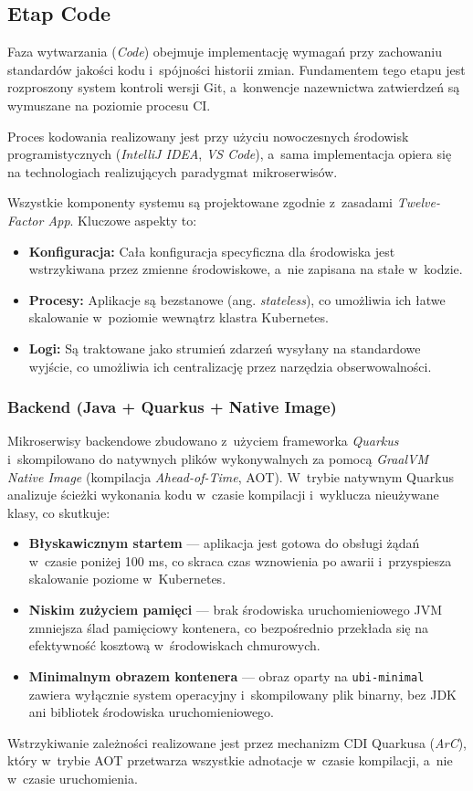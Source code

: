 \subsection{Etap Code}
Faza wytwarzania (\textit{Code}) obejmuje implementację wymagań przy zachowaniu standardów jakości kodu i~spójności historii zmian. Fundamentem tego etapu jest rozproszony system kontroli wersji Git, a~konwencje nazewnictwa zatwierdzeń są wymuszane na poziomie procesu CI.

Proces kodowania realizowany jest przy użyciu nowoczesnych środowisk programistycznych (\textit{IntelliJ IDEA}, \textit{VS Code}), a~sama implementacja opiera się na technologiach realizujących paradygmat mikroserwisów.

Wszystkie komponenty systemu są projektowane zgodnie z~zasadami \textit{Twelve-Factor App}. Kluczowe aspekty to:
\begin{itemize}
    \item \textbf{Konfiguracja:} Cała konfiguracja specyficzna dla środowiska jest wstrzykiwana przez zmienne środowiskowe, a~nie zapisana na stałe w~kodzie.
    \item \textbf{Procesy:} Aplikacje są bezstanowe (ang. \textit{stateless}), co umożliwia ich łatwe skalowanie w~poziomie wewnątrz klastra Kubernetes.
    \item \textbf{Logi:} Są traktowane jako strumień zdarzeń wysyłany na standardowe wyjście, co umożliwia ich centralizację przez narzędzia obserwowalności.
\end{itemize}


\subsubsection{Backend (Java + Quarkus + Native Image)}
Mikroserwisy backendowe zbudowano z~użyciem frameworka \textit{Quarkus} i~skompilowano do natywnych plików wykonywalnych za pomocą \textit{GraalVM Native Image} (kompilacja \textit{Ahead-of-Time}, AOT). W~trybie natywnym Quarkus analizuje ścieżki wykonania kodu w~czasie kompilacji i~wyklucza nieużywane klasy, co skutkuje:
\begin{itemize}
    \item \textbf{Błyskawicznym startem} --- aplikacja jest gotowa do obsługi żądań w~czasie poniżej 100 ms, co skraca czas wznowienia po awarii i~przyspiesza skalowanie poziome w~Kubernetes.
    \item \textbf{Niskim zużyciem pamięci} --- brak środowiska uruchomieniowego JVM zmniejsza ślad pamięciowy kontenera, co bezpośrednio przekłada się na efektywność kosztową w~środowiskach chmurowych.
    \item \textbf{Minimalnym obrazem kontenera} --- obraz oparty na \texttt{ubi-minimal} zawiera wyłącznie system operacyjny i~skompilowany plik binarny, bez JDK ani bibliotek środowiska uruchomieniowego.
\end{itemize}
Wstrzykiwanie zależności realizowane jest przez mechanizm CDI Quarkusa (\textit{ArC}), który w~trybie AOT przetwarza wszystkie adnotacje w~czasie kompilacji, a~nie w~czasie uruchomienia.

